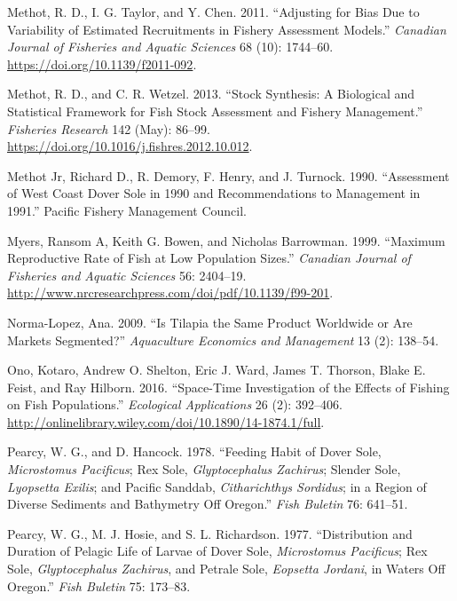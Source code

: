 \documentclass[11pt,
  english,
  a4paper,
]{article}
\begin{document}
\begin{cslreferences}
\leavevmode\hypertarget{ref-methot_adjusting_2011}{}%
Methot, R. D., I. G. Taylor, and Y. Chen. 2011. ``Adjusting for Bias Due to Variability of Estimated Recruitments in Fishery Assessment Models.'' \emph{Canadian Journal of Fisheries and Aquatic Sciences} 68 (10): 1744--60. \url{https://doi.org/10.1139/f2011-092}.

\leavevmode\hypertarget{ref-methot_stock_2013}{}%
Methot, R. D., and C. R. Wetzel. 2013. ``Stock Synthesis: A Biological and Statistical Framework for Fish Stock Assessment and Fishery Management.'' \emph{Fisheries Research} 142 (May): 86--99. \url{https://doi.org/10.1016/j.fishres.2012.10.012}.

\leavevmode\hypertarget{ref-methot_jr_assessment_1990}{}%
Methot Jr, Richard D., R. Demory, F. Henry, and J. Turnock. 1990. ``Assessment of West Coast Dover Sole in 1990 and Recommendations to Management in 1991.'' Pacific Fishery Management Council.

\leavevmode\hypertarget{ref-myers_maximum_1999}{}%
Myers, Ransom A, Keith G. Bowen, and Nicholas Barrowman. 1999. ``Maximum Reproductive Rate of Fish at Low Population Sizes.'' \emph{Canadian Journal of Fisheries and Aquatic Sciences} 56: 2404--19. \url{http://www.nrcresearchpress.com/doi/pdf/10.1139/f99-201}.

\leavevmode\hypertarget{ref-norma-lopez_is_2009}{}%
Norma-Lopez, Ana. 2009. ``Is Tilapia the Same Product Worldwide or Are Markets Segmented?'' \emph{Aquaculture Economics and Management} 13 (2): 138--54.

\leavevmode\hypertarget{ref-ono_space-time_2016}{}%
Ono, Kotaro, Andrew O. Shelton, Eric J. Ward, James T. Thorson, Blake E. Feist, and Ray Hilborn. 2016. ``Space-Time Investigation of the Effects of Fishing on Fish Populations.'' \emph{Ecological Applications} 26 (2): 392--406. \url{http://onlinelibrary.wiley.com/doi/10.1890/14-1874.1/full}.

\leavevmode\hypertarget{ref-pearcy_feeding_1978}{}%
Pearcy, W. G., and D. Hancock. 1978. ``Feeding Habit of Dover Sole, \emph{Microstomus Pacificus}; Rex Sole, \emph{Glyptocephalus Zachirus}; Slender Sole, \emph{Lyopsetta Exilis}; and Pacific Sanddab, \emph{Citharichthys Sordidus}; in a Region of Diverse Sediments and Bathymetry Off Oregon.'' \emph{Fish Buletin} 76: 641--51.

\leavevmode\hypertarget{ref-pearcy_distribution_1977}{}%
Pearcy, W. G., M. J. Hosie, and S. L. Richardson. 1977. ``Distribution and Duration of Pelagic Life of Larvae of Dover Sole, \emph{Microstomus Pacificus}; Rex Sole, \emph{Glyptocephalus Zachirus}, and Petrale Sole, \emph{Eopsetta Jordani}, in Waters Off Oregon.'' \emph{Fish Buletin} 75: 173--83.


\end{cslreferences}
\end{document}
